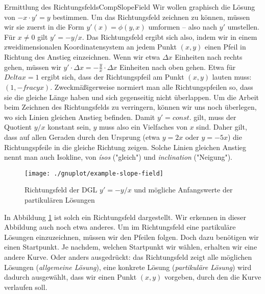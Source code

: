 \begin{example}{Ermittlung des Richtungsfelds}{CompSlopeField}
    Wir wollen graphisch die Lösung von $-x \cdot y'=y$ bestimmen. Um das Richtungsfeld zeichnen zu können, müssen wir sie zuerst in die Form $y'(x) = \phi(y,x)$ umformen -- also nach $y'$ umstellen. Für $x \ne 0$ gilt $y' = -y/x$. Das Richtungsfeld ergibt sich also, indem wir in einem zweidimensionalen Koordinatensystem an jedem Punkt $(x,y)$ einen Pfeil in Richtung des Anstieg einzeichnen. Wenn wir etwa $\Delta x$ Einheiten nach rechts gehen, müssen wir $y' \cdot \Delta x = -\frac{y}{x} \cdot \Delta x$ Einheiten nach oben gehen. Etwa für $Delta x = 1$ ergibt sich, dass der Richtungspfeil am Punkt $(x,y)$ lauten muss: $(1,-frac{y}{x})$. Zweckmäßigerweise normiert man alle Richtungspfeilen so, dass sie die gleiche Länge haben und sich gegenseitig nicht überlappen.
    Um die Arbeit beim Zeichnen des Richtungsfelds zu verringern, können wir uns noch überlegen, wo sich Linien gleichen Anstieg befinden. Damit $y'=const.$ gilt, muss der Quotient $y/x$ konstant sein, $y$ muss also ein Vielfaches von $x$ sind. Daher gilt, dass auf allen Geraden durch den Ursprung (etwa $y=2x$ oder $y=-5x$) die Richtungspfeile in die gleiche Richtung zeigen. Solche Linien gleichen Anstieg nennt man auch Isokline, von \emph{ísos} ("gleich") und \emph{inclination} ("Neigung").
\end{example}

\begin{figure}
    \centering
    \texttt{[image: ./gnuplot/example-slope-field]}
    \caption{Richtungsfeld der DGL $y'=-y/x$ und mögliche Anfangswerte der partikulären Lösungen}
    \label{fig:ExSlopField}
\end{figure}

In Abbildung \ref{fig:ExSlopField} ist solch ein Richtungsfeld dargestellt. Wir erkennen in dieser Abbildung auch noch etwa anderes. Um im Richtungsfeld eine partikuläre Lösungen einzuzeichnen, müssen wir den Pfeilen folgen. Doch dazu benötigen wir einen Startpunkt. Je nachdem, welchen Startpunkt wir wählen, erhalten wir eine andere Kurve. Oder anders ausgedrückt: das Richtungsfeld zeigt alle möglichen Lösungen (\emph{allgemeine Lösung}), eine konkrete Lösung (\emph{partikuläre Lösung}) wird dadurch ausgewählt, dass wir einen Punkt $(x,y)$ vorgeben, durch den die Kurve verlaufen soll.

